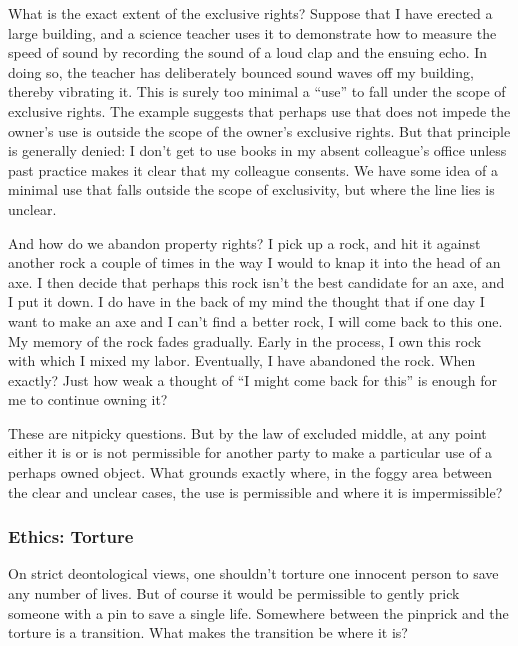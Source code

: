 What is the exact extent of the exclusive rights? Suppose that I have erected a large 
building, and a science teacher uses it to demonstrate how to measure the speed of sound by recording the sound of a loud 
clap and the ensuing echo. In doing so, the teacher has deliberately bounced sound waves off my building, thereby vibrating 
it. This is surely too minimal a ``use'' to fall under the scope of exclusive rights. The example suggests that perhaps use that 
does not impede the owner's use is outside the scope of the owner's exclusive rights. But that principle is generally 
denied: I don't get to use books in my absent colleague's office unless past practice makes it clear that my 
colleague consents. We have some idea of a minimal use that falls outside the scope of exclusivity, but where the 
line lies is unclear.

And how do we abandon property rights? I pick up a rock, and hit it against another rock a couple of times in the way
I would to knap it into the head of an axe. I then decide that perhaps this rock isn't the best candidate for an axe, and I
put it down. I do have in the back of my mind the thought that if one day I want to make an axe and I can't find a better 
rock, I will come back to this one. My memory of the rock fades gradually. Early in the process, I own this 
rock with which I mixed my labor. Eventually, I have abandoned the rock. When exactly? Just how weak a thought of ``I might 
come back for this'' is enough for me to continue owning it? 

These are nitpicky questions. But by the law of excluded middle, at any point either it is or is not permissible 
for another party to make a 
particular use of a perhaps owned object. What grounds exactly where, in the foggy area between the clear and unclear cases, the
use is permissible and where it is impermissible? 

\subsubsection{Ethics: Torture}
On strict deontological views, one shouldn't torture one innocent person to save any number of lives. But of course
it would be permissible to gently prick someone with a pin to save a single life. Somewhere between the pinprick
and the torture is a transition. What makes the transition be where it is?


